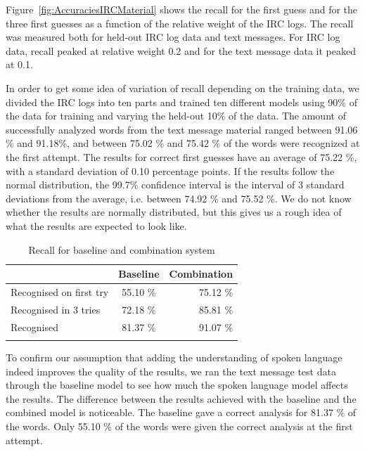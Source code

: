 \documentclass[a4paper,conference]{IEEEtran}
\begin{document}
Figure~\ref{fig:AccuraciesIRCMaterial} shows the recall for the first
guess and for the three first guesses as a function of the relative
weight of the IRC logs. The recall was measured both for held-out
IRC log data and text messages. For IRC log data, recall peaked
at relative weight 0.2 and for the text message data it peaked at 0.1.

In order to get some idea of variation of recall depending on the
training data, we divided the IRC logs into ten parts and trained ten
different models using 90\% of the data for training and varying the
held-out 10\% of the data. The amount of successfully analyzed words
from the text message material ranged between 91.06 \% and 91.18\%,
and between 75.02 \% and 75.42 \% of the words were recognized at the
first attempt. The results for correct first guesses have an average
of 75.22 \%, with a standard deviation of 0.10 percentage points. If
the results follow the normal distribution, the 99.7\% confidence
interval is the interval of 3 standard deviations from the average,
i.e. between 74.92 \% and 75.52 \%. We do not know whether the results
are normally distributed, but this gives us a rough idea of what the
results are expected to look like.

\begin{table}[!t]
\caption{Recall for baseline and combination system}
\begin{center}
\begin{tabular} {l c r}
 & Baseline & Combination \\
 \hline
Recognised on first try \rule{0pt}{2.6ex} & 55.10 \% & 75.12 \% \\
Recognised in 3 tries & 72.18 \% & 85.81 \% \\
Recognised & 81.37 \% & 91.07 \% \\
\hline
 & & \\
\end{tabular}
\end{center}
\label{tab:recall}
\end{table}


To confirm our assumption that adding the understanding of spoken
language indeed improves the quality of the results, we ran the text
message test data through the baseline model to see how much the
spoken language model affects the results. The difference between the
results achieved with the baseline and the combined model is
noticeable. The baseline gave a correct analysis for 81.37 \% of the
words. Only 55.10 \% of the words were given the correct analysis at
the first attempt.
\end{document}
